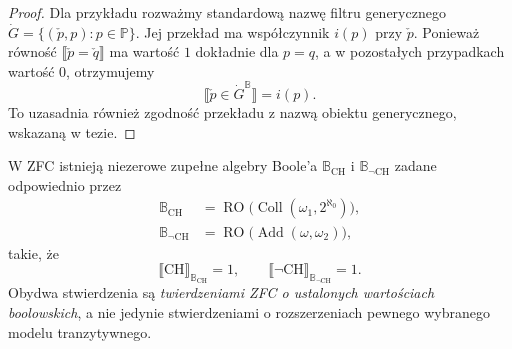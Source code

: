 \begin{proof}
Dla przykładu rozważmy
standardową nazwę filtru
generycznego
$\dot G=\{(\check p,p):p\in\mathbb P\}$.
Jej przekład ma współczynnik
$i(p)$ przy $\check p$.
Ponieważ równość
$\llbracket\check p=\check q\rrbracket$
ma wartość $1$ dokładnie dla
$p=q$, a w pozostałych przypadkach
wartość $0$, otrzymujemy
\[
 \llbracket\check p\in
            \dot G^{\mathbb B}\rrbracket=i(p).
\]
To uzasadnia również zgodność
przekładu z nazwą obiektu
generycznego, wskazaną w tezie.
\end{proof}

\begin{twierdzenie}
\label{thm:boolean35-two-algebras}
W ZFC istnieją niezerowe
zupełne algebry Boole'a
$\mathbb B_{\mathrm{CH}}$ i
$\mathbb B_{\neg\mathrm{CH}}$
zadane odpowiednio przez
\[
\begin{aligned}
 \mathbb B_{\mathrm{CH}}
 &=\operatorname{RO}\bigl(
   \operatorname{Coll}(\omega_1,2^{\aleph_0})
                        \bigr),\\
 \mathbb B_{\neg\mathrm{CH}}
 &=\operatorname{RO}\bigl(
   \operatorname{Add}(\omega,\omega_2)
                        \bigr),
\end{aligned}
\]
takie, że
\[
 \llbracket\mathrm{CH}\rrbracket_{
      \mathbb B_{\mathrm{CH}}}=1,\qquad
 \llbracket\neg\mathrm{CH}\rrbracket_{
      \mathbb B_{\neg\mathrm{CH}}}=1.
\]
Obydwa stwierdzenia są
\emph{twierdzeniami ZFC o
ustalonych wartościach boolowskich},
a nie jedynie stwierdzeniami
o rozszerzeniach pewnego
wybranego modelu tranzytywnego.
\end{twierdzenie}
